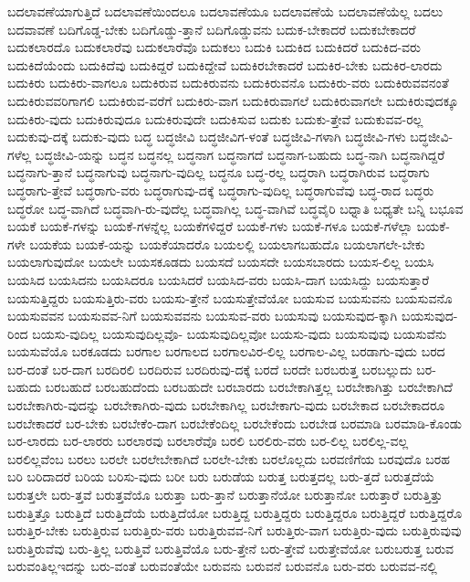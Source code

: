 {ಬದಲಾವಣೆಯಾಗುತ್ತಿದೆ
ಬದಲಾವಣೆಯಿಂದಲೂ
ಬದಲಾವಣೆಯೂ
ಬದಲಾವಣೆಯೆ
ಬದಲಾವಣೆಯೆಲ್ಲ
ಬದಲು
ಬದವಾವಣೆ
ಬದಿಗೊಡ್ಡ-ಬೇಕು
ಬದಿಗೊಡ್ಡು-ತ್ತಾನೆ
ಬದಿಗೊಡ್ಡುವನು
ಬದುಕ-ಬೇಕಾದರೆ
ಬದುಕಬೇಕಾದರೆ
ಬದುಕಲಾರದೊ
ಬದುಕಲಾರೆವು
ಬದುಕಲಾರೆವೊ
ಬದುಕಲು
ಬದುಕಿ
ಬದುಕಿದ
ಬದುಕಿದರೆ
ಬದುಕಿದ-ವರು
ಬದುಕಿದೆಯೆಂದು
ಬದುಕಿದೆವು
ಬದುಕಿದ್ದರೆ
ಬದುಕಿದ್ದೇವೆ
ಬದುಕಿರಬೇಕಾದರೆ
ಬದುಕಿರ-ಬೇಕು
ಬದುಕಿರ-ಲಾರದು
ಬದುಕಿರು
ಬದುಕಿರು-ವಾಗಲೂ
ಬದುಕಿರುವ
ಬದುಕಿರುವನು
ಬದುಕಿರುವನೊ
ಬದುಕಿರು-ವರು
ಬದುಕಿರುವವನಂತೆ
ಬದುಕಿರುವವರಿಗಾಗಲಿ
ಬದುಕಿರುವ-ವರೆಗೆ
ಬದುಕಿರು-ವಾಗ
ಬದುಕಿರುವಾಗಲೆ
ಬದುಕಿರುವಾಗಲೇ
ಬದುಕಿರುವುದಕ್ಕೂ
ಬದುಕಿರು-ವುದು
ಬದುಕಿರುವುದೂ
ಬದುಕಿರುವುದೇ
ಬದುಕಿಸುವ
ಬದುಕು
ಬದುಕು-ತ್ತೇವೆ
ಬದುಕುವವ-ರಲ್ಲ
ಬದುಕುವು-ದಕ್ಕೆ
ಬದುಕು-ವುದು
ಬದ್ಧ
ಬದ್ಧಜೀವಿ
ಬದ್ಧಜೀವಿಗ-ಳಂತೆ
ಬದ್ಧಜೀವಿ-ಗಳಾಗಿ
ಬದ್ಧಜೀವಿ-ಗಳು
ಬದ್ಧಜೀವಿ-ಗಳೆಲ್ಲ
ಬದ್ಧಜೀವಿ-ಯನ್ನು
ಬದ್ಧನ
ಬದ್ಧನಲ್ಲ
ಬದ್ಧನಾಗ
ಬದ್ಧನಾಗದೆ
ಬದ್ಧನಾಗ-ಬಹುದು
ಬದ್ಧ-ನಾಗಿ
ಬದ್ಧನಾಗಿದ್ದರೆ
ಬದ್ಧನಾಗು-ತ್ತಾನೆ
ಬದ್ಧನಾಗುವು
ಬದ್ಧನಾಗು-ವುದಿಲ್ಲ
ಬದ್ಧನೂ
ಬದ್ಧ-ರಲ್ಲ
ಬದ್ಧರಾಗಿ
ಬದ್ಧರಾಗಿರುವ
ಬದ್ಧರಾಗು
ಬದ್ಧರಾಗು-ತ್ತೇವೆ
ಬದ್ಧರಾಗು-ವರು
ಬದ್ಧರಾಗುವು-ದಕ್ಕೆ
ಬದ್ಧರಾಗು-ವುದಿಲ್ಲ
ಬದ್ಧರಾಗುವೆವು
ಬದ್ಧ-ರಾದ
ಬದ್ಧರು
ಬದ್ಧರೋ
ಬದ್ಧ-ವಾಗಿದೆ
ಬದ್ಧವಾಗಿ-ರು-ವುದೆಲ್ಲ
ಬದ್ಧವಾಗಿಲ್ಲ
ಬದ್ಧ-ವಾಗಿವೆ
ಬದ್ಧವೈರಿ
ಬಧ್ನಾತಿ
ಬಧ್ಯತೇ
ಬನ್ನಿ
ಬಭೂವ
ಬಯಕೆ
ಬಯಕೆ-ಗಳನ್ನು
ಬಯಕೆ-ಗಳನ್ನೆಲ್ಲ
ಬಯಕೆಗಳಿದ್ದರೆ
ಬಯಕೆ-ಗಳು
ಬಯಕೆ-ಗಳೂ
ಬಯಕೆ-ಗಳೆಲ್ಲಾ
ಬಯಕೆ-ಗಳೇ
ಬಯಕೆಯ
ಬಯಕೆ-ಯನ್ನು
ಬಯಕೆಯಾದರೊ
ಬಯಲಲ್ಲಿ
ಬಯಲಾಗಬಹುದೊ
ಬಯಲಾಗಲೇ-ಬೇಕು
ಬಯಲಾಗುವುದೋ
ಬಯಲೇ
ಬಯಸಕೂಡದು
ಬಯಸದೆ
ಬಯಸದೇ
ಬಯಸಬಾರದು
ಬಯಸ-ಲಿಲ್ಲ
ಬಯಸಿ
ಬಯಸಿದ
ಬಯಸಿದನು
ಬಯಸಿದರೂ
ಬಯಸಿದರೆ
ಬಯಸಿದ-ವರು
ಬಯಸಿ-ದಾಗ
ಬಯಸಿದ್ದು
ಬಯಸುತ್ತಾರೆ
ಬಯಸುತ್ತಿದ್ದರು
ಬಯಸುತ್ತಿರು-ವರು
ಬಯಸು-ತ್ತೇನೆ
ಬಯಸುತ್ತೇವೆಯೋ
ಬಯಸುವ
ಬಯಸುವನು
ಬಯಸುವನೊ
ಬಯಸುವವನ
ಬಯಸುವವ-ನಿಗೆ
ಬಯಸುವವನು
ಬಯಸುವ-ವರು
ಬಯಸುವು
ಬಯಸುವುದ-ಕ್ಕಾಗಿ
ಬಯಸುವುದ-ರಿಂದ
ಬಯಸು-ವುದಿಲ್ಲ
ಬಯಸುವುದಿಲ್ಲವೊ-
ಬಯಸುವುದಿಲ್ಲವೋ
ಬಯಸು-ವುದು
ಬಯಸುವುವು
ಬಯಸುವೆನು
ಬಯಸುವೆಯೊ
ಬರಕೂಡದು
ಬರಗಾಲ
ಬರಗಾಲದ
ಬರಗಾಲವಿರ-ಲಿಲ್ಲ
ಬರಗಾಲ-ವಿಲ್ಲ
ಬರಡಾಗು-ವುದು
ಬರದ
ಬರ-ದಂತೆ
ಬರ-ದಾಗ
ಬರದಿರಲಿ
ಬರದಿರುವ
ಬರದಿರುವು-ದಕ್ಕೆ
ಬರದೆ
ಬರದೇ
ಬರಬರುತ್ತ
ಬರಬಲ್ಲುದು
ಬರ-ಬಹುದು
ಬರಬಹುದೆ
ಬರಬಹುದೆಂದು
ಬರಬಹುದೇ
ಬರಬಾರದು
ಬರಬೇಕಾಗಿತ್ತಲ್ಲ
ಬರಬೇಕಾಗಿತ್ತು
ಬರಬೇಕಾಗಿದೆ
ಬರಬೇಕಾಗಿರು-ವುದನ್ನು
ಬರಬೇಕಾಗಿರು-ವುದು
ಬರಬೇಕಾಗಿಲ್ಲ
ಬರಬೇಕಾಗು-ವುದು
ಬರಬೇಕಾದ
ಬರಬೇಕಾದರೂ
ಬರಬೇಕಾದರೆ
ಬರ-ಬೇಕು
ಬರಬೇಕೆಂ-ದಾಗ
ಬರಬೇಕೆಂದಿಲ್ಲ
ಬರಬೇಕೆಂದು
ಬರಬೇಡ
ಬರಮಾಡಿ
ಬರಮಾಡಿ-ಕೊಂಡು
ಬರ-ಲಾರದು
ಬರ-ಲಾರರು
ಬರಲಾರವು
ಬರಲಾರೆವೊ
ಬರಲಿ
ಬರಲಿರು-ವರು
ಬರ-ಲಿಲ್ಲ
ಬರಲಿಲ್ಲ-ವಲ್ಲ
ಬರಲಿಲ್ಲವೆಂಬ
ಬರಲು
ಬರಲೇ
ಬರಲೇಬೇಕಾಗಿದೆ
ಬರಲೇ-ಬೇಕು
ಬರಲೊಲ್ಲದು
ಬರವಣಿಗೆಯ
ಬರವುದೊ
ಬರಹ
ಬರಿ
ಬರಿದಾದರೆ
ಬರಿಯ
ಬರಿಸು-ವುದು
ಬರೀ
ಬರು
ಬರುಡೆಯ
ಬರುತ್ತ
ಬರುತ್ತದಲ್ಲ
ಬರು-ತ್ತದೆ
ಬರುತ್ತದೆಯೆ
ಬರುತ್ತಲೇ
ಬರು-ತ್ತವೆ
ಬರುತ್ತವೆಯೊ
ಬರುತ್ತಾ
ಬರು-ತ್ತಾನೆ
ಬರುತ್ತಾನೆಯೋ
ಬರುತ್ತಾನೋ
ಬರುತ್ತಾರೆ
ಬರುತ್ತಿತ್ತು
ಬರುತ್ತಿತ್ತೊ
ಬರುತ್ತಿದೆ
ಬರುತ್ತಿದೆಯೆ
ಬರುತ್ತಿದೆಯೋ
ಬರುತ್ತಿದ್ದ
ಬರುತ್ತಿದ್ದರು
ಬರುತ್ತಿದ್ದರೂ
ಬರುತ್ತಿದ್ದರೆ
ಬರುತ್ತಿದ್ದರೊ
ಬರುತ್ತಿರ-ಬೇಕು
ಬರುತ್ತಿರುವ
ಬರುತ್ತಿರು-ವರು
ಬರುತ್ತಿರುವವ-ನಿಗೆ
ಬರುತ್ತಿರು-ವಾಗ
ಬರುತ್ತಿರು-ವುದು
ಬರುತ್ತಿರುವುವು
ಬರುತ್ತಿರುವೆವು
ಬರು-ತ್ತಿಲ್ಲ
ಬರುತ್ತಿವೆ
ಬರುತ್ತಿವೆಯೊ
ಬರು-ತ್ತೇನೆ
ಬರು-ತ್ತೇವೆ
ಬರುತ್ತೇವೆಯೋ
ಬರುಬರುತ್ತ
ಬರುವ
ಬರುವಂತಿಲ್ಲಇದನ್ನು
ಬರು-ವಂತೆ
ಬರುವಂತೆಯೇ
ಬರುವನು
ಬರುವನೆ
ಬರುವನೊ
ಬರು-ವರು
ಬರುವವ-ನಲ್ಲಿ
}

